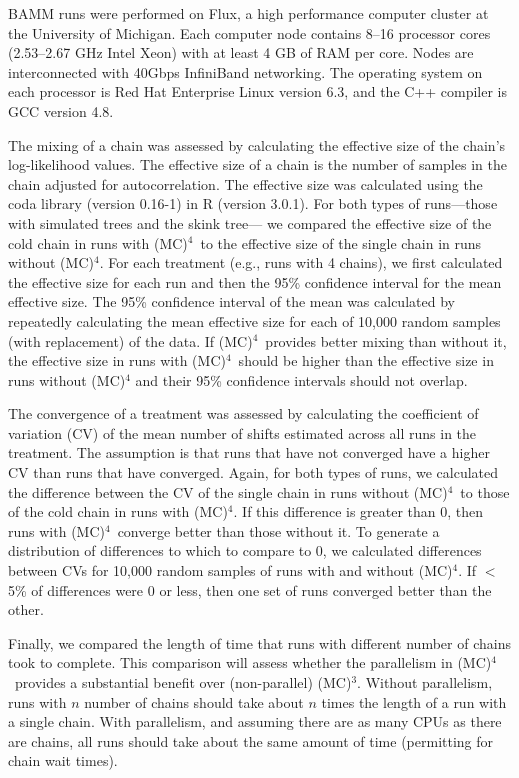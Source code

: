 \documentclass[12pt]{article}
\newcommand{\MCMCMC}{(MC)$^{3}$}
\newcommand{\MCMCMCMC}{(MC)$^{4}$}
\begin{document}
BAMM runs were performed on Flux,
a high performance computer cluster at the University of Michigan.
%
Each computer node contains 8--16 processor cores
(2.53--2.67 GHz Intel Xeon) with at least 4 GB of RAM per core.
%
Nodes are interconnected with 40Gbps InfiniBand networking.
%
The operating system on each processor
is Red Hat Enterprise Linux version 6.3,
and the C++ compiler is GCC version 4.8.


The mixing of a chain was assessed by calculating
the effective size of the chain's log-likelihood values.
%
The effective size of a chain is the number of samples
in the chain adjusted for autocorrelation.
%
The effective size was calculated using
the coda library (version 0.16-1) in R (version 3.0.1).
%
For both types of runs---those with simulated trees and the skink tree---%
we compared the effective size of the cold chain in runs with \MCMCMCMC\ 
to the effective size of the single chain in runs without \MCMCMCMC.
%
For each treatment (e.g., runs with 4 chains),
we first calculated the effective size for each run
and then the 95\% confidence interval for the mean effective size.
%
The 95\% confidence interval of the mean was calculated
by repeatedly calculating the mean effective size
for each of 10,000 random samples (with replacement) of the data.
%
If \MCMCMCMC\ provides better mixing than without it,
the effective size in runs with \MCMCMCMC\ should be higher
than the effective size in runs without \MCMCMCMC
and their 95\% confidence intervals should not overlap.


The convergence of a treatment was assessed
by calculating the coefficient of variation (CV) of the mean number of shifts
estimated across all runs in the treatment.
%
The assumption is that runs that have not converged
have a higher CV than runs that have converged.
%
Again, for both types of runs,
we calculated the difference between the CV
of the single chain in runs without \MCMCMCMC\ 
to those of the cold chain in runs with \MCMCMCMC.
%
If this difference is greater than 0,
then runs with \MCMCMCMC\ converge better than those without it.
%
To generate a distribution of differences to which to compare to 0,
we calculated differences between CVs for 10,000 random samples
of runs with and without \MCMCMCMC.
%
If $<$ 5\% of differences were 0 or less, then
one set of runs converged better than the other.


Finally, we compared the length of time that runs
with different number of chains took to complete.
%
This comparison will assess whether the parallelism in \MCMCMCMC\ 
provides a substantial benefit over (non-parallel) \MCMCMC.
%
Without parallelism, runs with $n$ number of chains
should take about $n$ times the length of a run with a single chain.
%
With parallelism, and assuming there are as many CPUs as there are chains,
all runs should take about the same amount of time
(permitting for chain wait times).
\end{document}
